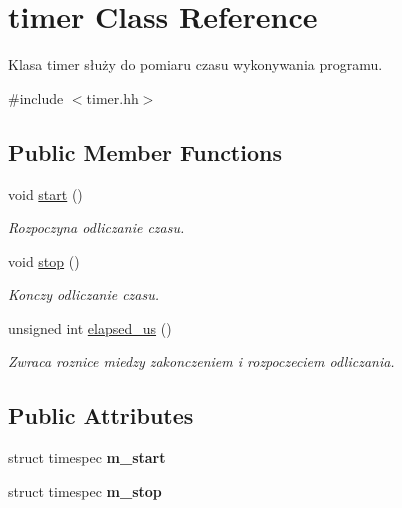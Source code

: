 \hypertarget{classtimer}{\section{timer \-Class \-Reference}
\label{classtimer}
}


\-Klasa timer służy do pomiaru czasu wykonywania programu.  




{\ttfamily \#include $<$timer.\-hh$>$}

\subsection*{\-Public \-Member \-Functions}
\begin{DoxyCompactItemize}
\item 
void \hyperlink{classtimer_a9aa894a57748b2bdf3adce46f5736794}{start} ()
\begin{DoxyCompactList}\small\item\em \-Rozpoczyna odliczanie czasu. \end{DoxyCompactList}\item 
void \hyperlink{classtimer_a3218d61649e284071544b17c8c915ecc}{stop} ()
\begin{DoxyCompactList}\small\item\em \-Konczy odliczanie czasu. \end{DoxyCompactList}\item 
unsigned int \hyperlink{classtimer_ad4f64bfba81d59d6712e21332c544cd7}{elapsed\-\_\-us} ()
\begin{DoxyCompactList}\small\item\em \-Zwraca roznice miedzy zakonczeniem i rozpoczeciem odliczania. \end{DoxyCompactList}\end{DoxyCompactItemize}
\subsection*{\-Public \-Attributes}
\begin{DoxyCompactItemize}
\item 
\hypertarget{classtimer_ad58e5d25d94d6758731d64b943c059d9}{struct timespec {\bfseries m\-\_\-start}}\label{classtimer_ad58e5d25d94d6758731d64b943c059d9}

\item 
\hypertarget{classtimer_a215cff76d3f6abc54112640367d0a07c}{struct timespec {\bfseries m\-\_\-stop}}\label{classtimer_a215cff76d3f6abc54112640367d0a07c}

\end{DoxyCompactItemize}


